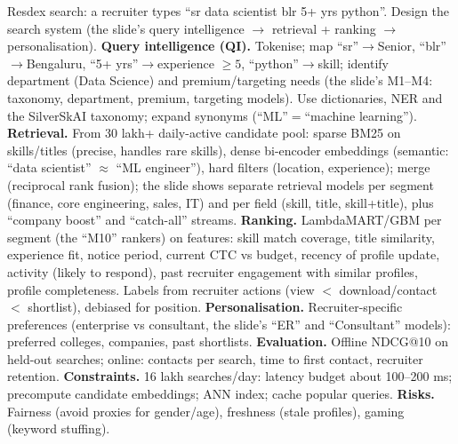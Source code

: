 \begin{qa}{\deep Resdex search: a recruiter types ``sr data scientist blr 5+ yrs python''. Design the search system (the slide's query intelligence $\to$ retrieval + ranking $\to$
personalisation).}
\why
\textbf{Query intelligence (QI).} Tokenise; map ``sr''$\to$Senior, ``blr''$\to$Bengaluru, ``5+ yrs''$\to$experience $\ge5$, ``python''$\to$skill; identify department (Data Science) and
premium/targeting needs (the slide's M1--M4: taxonomy, department, premium, targeting models). Use dictionaries, NER and the SilverSkAI taxonomy; expand synonyms (``ML''$=$``machine learning'').
\textbf{Retrieval.} From 30 lakh+ daily-active candidate pool: sparse BM25 on skills/titles (precise, handles rare skills), dense bi-encoder embeddings (semantic: ``data scientist'' $\approx$
``ML engineer''), hard filters (location, experience); merge (reciprocal rank fusion); the slide shows separate retrieval models per segment (finance, core engineering, sales, IT)
and per field (skill, title, skill+title), plus ``company boost'' and ``catch-all'' streams.
\textbf{Ranking.} LambdaMART/GBM per segment (the ``M10'' rankers) on features: skill match coverage, title similarity, experience fit, notice period, current CTC vs budget, recency of
profile update, activity (likely to respond), past recruiter engagement with similar profiles, profile completeness. Labels from recruiter actions (view $<$ download/contact $<$ shortlist),
debiased for position.
\textbf{Personalisation.} Recruiter-specific preferences (enterprise vs consultant, the slide's ``ER'' and ``Consultant'' models): preferred colleges, companies, past shortlists.
\textbf{Evaluation.} Offline NDCG@10 on held-out searches; online: contacts per search, time to first contact, recruiter retention.
\textbf{Constraints.} 16 lakh searches/day: latency budget about 100--200 ms; precompute candidate embeddings; ANN index; cache popular queries.
\textbf{Risks.} Fairness (avoid proxies for gender/age), freshness (stale profiles), gaming (keyword stuffing).
\end{qa}

